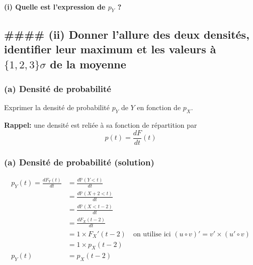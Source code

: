 \documentclass[11pt]{article}
\begin{document}
\hypertarget{i-quelle-est-lexpression-de-p_y}{%
\paragraph{\texorpdfstring{(i) Quelle est l'expression de \(p_Y\)
?}{(i) Quelle est l'expression de p\_Y ?}}\label{i-quelle-est-lexpression-de-p_y}}

\hypertarget{ii-donner-lallure-des-deux-densituxe9s-identifier-leur-maximum-et-les-valeurs-uxe0-123sigma-de-la-moyenne}{%
\subsection{\texorpdfstring{\#\#\#\# (ii) Donner l'allure des deux
densités, identifier leur maximum et les valeurs à \(\{1,2,3\}\sigma\)
de la
moyenne}{\#\#\#\# (ii) Donner l'allure des deux densités, identifier leur maximum et les valeurs à \textbackslash\{1,2,3\textbackslash\}\textbackslash sigma de la moyenne}}\label{ii-donner-lallure-des-deux-densituxe9s-identifier-leur-maximum-et-les-valeurs-uxe0-123sigma-de-la-moyenne}}

    \hypertarget{a-densituxe9-de-probabilituxe9}{%
\subsubsection{(a) Densité de
probabilité}\label{a-densituxe9-de-probabilituxe9}}

Exprimer la densité de probabilité \(p_Y\) de \(Y\) en fonction de
\(p_X\).

\textbf{Rappel:} une densité est reliée à sa fonction de répartition par
\[p(t) = \frac{dF}{dt}(t)\]

    \hypertarget{a-densituxe9-de-probabilituxe9-solution}{%
\subsubsection{(a) Densité de probabilité
(solution)}\label{a-densituxe9-de-probabilituxe9-solution}}

\begin{align}
    p_Y(t)  = \frac{dF_Y(t)}{dt}
            &= \frac{d\mathbb{P}(Y < t)}{dt}\\
            &= \frac{d\mathbb{P}(X+2 < t)}{dt}\\
            &= \frac{d\mathbb{P}(X < t-2)}{dt}\\
            &= \frac{dF_X(t-2)}{dt}\\
            &= 1\times F_X'(t-2)\quad\text{on utilise ici }(u \circ v)' = v' \times (u' \circ v)\\
            &= 1\times p_X(t-2)\\
    p_Y(t)  &= p_X(t-2)
\end{align}
\end{document}
